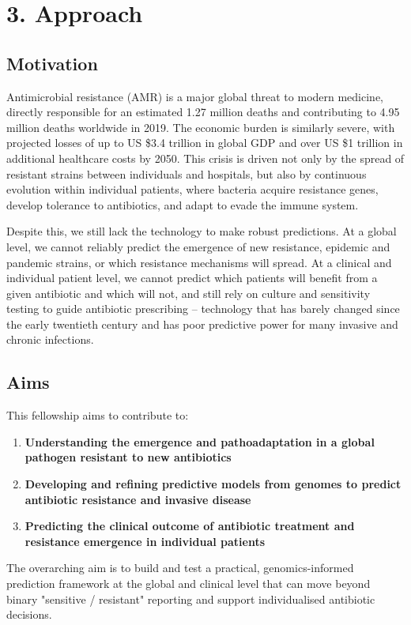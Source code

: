 \documentclass{article}
\begin{document}
\section*{3. Approach}
\subsection*{Motivation}
Antimicrobial resistance (AMR) is a major global threat to modern medicine, directly responsible for an estimated 1.27 million deaths and contributing to 4.95 million deaths worldwide in 2019. The economic burden is similarly severe, with projected losses of up to US \$3.4 trillion in global GDP and over US \$1 trillion in additional healthcare costs by 2050. This crisis is driven not only by the spread of resistant strains between individuals and hospitals, but also by continuous evolution within individual patients, where bacteria acquire resistance genes, develop tolerance to antibiotics, and adapt to evade the immune system.

Despite this, we still lack the technology to make robust predictions. At a global level, we cannot reliably predict the emergence of new resistance, epidemic and pandemic strains, or which resistance mechanisms will spread.  
At a clinical and individual patient level, we cannot predict which patients will benefit from a given antibiotic and which will not, and still rely on culture and sensitivity testing to guide antibiotic prescribing – technology that has barely changed since the early twentieth century and has poor predictive power for many invasive and chronic infections.

\subsection*{Aims}
This fellowship aims to contribute to: 
\begin{enumerate}
  \item[1.] \textbf{Understanding the emergence and pathoadaptation in a global pathogen resistant to new antibiotics}
  \item[2.] \textbf{Developing and refining predictive models from genomes to predict antibiotic resistance and invasive disease}
  \item[3.] \textbf{Predicting the clinical outcome of antibiotic treatment and resistance emergence in individual patients}
\end{enumerate}
The overarching aim is to build and test a practical, genomics-informed prediction framework at the global and clinical level that can move beyond binary "sensitive / resistant" reporting and support individualised antibiotic decisions. 
\end{document}
